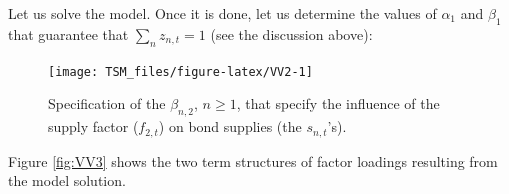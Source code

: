 \documentclass[
  12pt,
]{book}
\newenvironment{Shaded}{\begin{snugshade}}{\end{snugshade}}
\newcommand{\AttributeTok}[1]{\textcolor[rgb]{0.13,0.29,0.53}{#1}}
\newcommand{\ConstantTok}[1]{\textcolor[rgb]{0.56,0.35,0.01}{#1}}
\newcommand{\ControlFlowTok}[1]{\textcolor[rgb]{0.13,0.29,0.53}{\textbf{#1}}}
\newcommand{\DecValTok}[1]{\textcolor[rgb]{0.00,0.00,0.81}{#1}}
\newcommand{\FunctionTok}[1]{\textcolor[rgb]{0.13,0.29,0.53}{\textbf{#1}}}
\newcommand{\NormalTok}[1]{#1}
\newcommand{\OtherTok}[1]{\textcolor[rgb]{0.56,0.35,0.01}{#1}}
\newcommand{\SpecialCharTok}[1]{\textcolor[rgb]{0.81,0.36,0.00}{\textbf{#1}}}
\newcommand{\StringTok}[1]{\textcolor[rgb]{0.31,0.60,0.02}{#1}}
\theoremstyle{definition}
\theoremstyle{definition}
\theoremstyle{definition}
\theoremstyle{definition}
\theoremstyle{remark}
\begin{document}
Let us solve the model. Once it is done, let us determine the values of \(\alpha_1\) and \(\beta_1\) that guarantee that \(\sum_n z_{n,t}=1\) (see the discussion above):

\begin{Shaded}
\end{Shaded}

\begin{figure}
\texttt{[image: TSM\_files/figure-latex/VV2-1]} \caption{Specification of the $\beta_{n,2}$, $n\ge 1$, that specify the influence of the supply factor ($f_{2,t}$) on bond supplies (the $s_{n,t}$'s).}\label{fig:VV2}
\end{figure}

Figure \ref{fig:VV3} shows the two term structures of factor loadings resulting from the model solution.

\begin{Shaded}
\end{Shaded}
\end{document}
